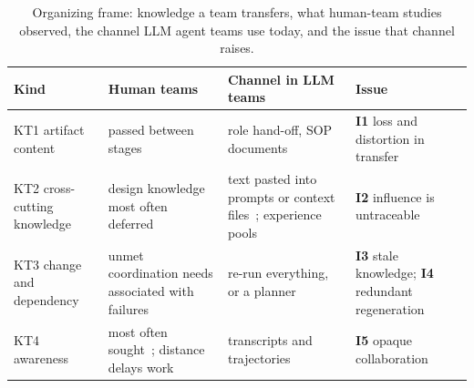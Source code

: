 \documentclass[10pt,conference]{IEEEtran}
\theoremstyle{definition}
\begin{document}
\begin{table}[t]
\centering
\caption{Organizing frame: knowledge a team transfers, what human-team studies observed, the channel LLM
agent teams use today, and the issue that channel raises.}
\label{tab:kt}
\scriptsize
\setlength{\tabcolsep}{2.5pt}
\begin{tabular}{@{}>{\raggedright}p{13mm}>{\raggedright}p{21mm}>{\raggedright}p{21mm}>{\raggedright\arraybackslash}p{25mm}@{}}
\toprule
Kind & Human teams & Channel in LLM teams & Issue \\
\midrule
KT1 artifact content & passed between stages & role hand-off, SOP
  documents~\cite{dong2024selfcollab,hong2024metagpt,qian2024chatdev} & \textbf{I1} loss and distortion in
  transfer~\cite{cemri2025mast} \\
KT2 cross-cutting knowledge & design knowledge most often deferred~\cite{ko2007information} & text pasted into
  prompts or context files~\cite{liang2025prompts}; experience pools~\cite{qian2024colearning} &
  \textbf{I2} influence is untraceable \\
KT3 change and dependency & unmet coordination needs associated with failures~\cite{cataldo2013coordination} &
  re-run everything, or a planner~\cite{bairi2024codeplan} & \textbf{I3} stale knowledge;
  \textbf{I4} redundant regeneration \\
KT4 awareness & most often sought~\cite{ko2007information}; distance delays work~\cite{herbsleb2003speed} &
  transcripts and trajectories~\cite{bouzenia2025trajectories,dong2024agentops} & \textbf{I5} opaque
  collaboration \\
\bottomrule
\end{tabular}
\end{table}
\end{document}
